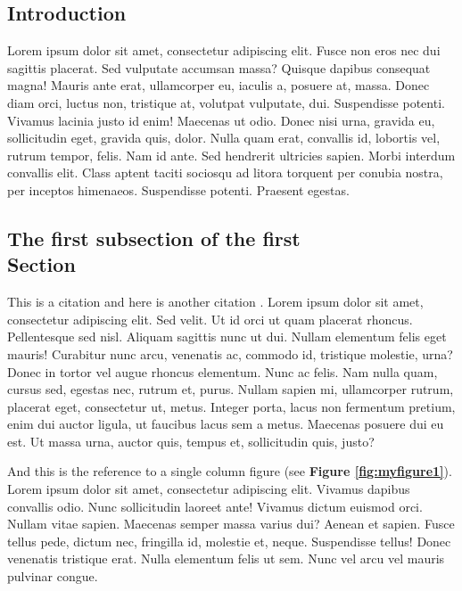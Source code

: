\documentclass[a4paper,10pt]{article}
\begin{document}
\vspace{4ex}	%
\begin{multicols}{2}

\section{Introduction}

Lorem ipsum dolor sit amet, consectetur adipiscing elit.  Fusce non eros nec dui
sagittis placerat. Sed vulputate accumsan massa? Quisque dapibus consequat
magna! Mauris ante erat, ullamcorper eu, iaculis a, posuere at, massa. Donec
diam orci, luctus non, tristique at, volutpat vulputate, dui.  Suspendisse
potenti. Vivamus lacinia justo id enim! Maecenas ut odio. Donec nisi urna,
gravida eu, sollicitudin eget, gravida quis, dolor. Nulla quam erat, convallis
id, lobortis vel, rutrum tempor, felis. Nam id ante. Sed hendrerit ultricies
sapien. Morbi interdum convallis elit. Class aptent taciti sociosqu ad litora
torquent per conubia nostra, per inceptos himenaeos. Suspendisse potenti.
Praesent egestas.


\subsection{The first subsection of the first \\ Section}

This is a citation \cite{Norman09Learn} and here is another citation
\cite{Peyton93Howto}.  Lorem ipsum dolor sit amet, consectetur adipiscing elit.
Sed velit. Ut id orci ut quam placerat rhoncus. Pellentesque sed nisl. Aliquam
sagittis nunc ut dui.  Nullam elementum felis eget mauris! Curabitur nunc arcu,
venenatis ac, commodo id, tristique molestie, urna? Donec in tortor vel augue
rhoncus elementum. Nunc ac felis. Nam nulla quam, cursus sed, egestas nec,
rutrum et, purus. Nullam sapien mi, ullamcorper rutrum, placerat eget,
consectetur ut, metus. Integer porta, lacus non fermentum pretium, enim dui
auctor ligula, ut faucibus lacus sem a metus. Maecenas posuere dui eu est. Ut
massa urna, auctor quis, tempus et, sollicitudin quis, justo?


And this is the reference to a single column figure (see {\bf Figure
\ref{fig:myfigure1}}).  Lorem ipsum dolor sit amet, consectetur adipiscing elit.
Vivamus dapibus convallis odio. Nunc sollicitudin laoreet ante! Vivamus dictum
euismod orci.  Nullam vitae sapien. Maecenas semper massa varius dui? Aenean et
sapien. Fusce tellus pede, dictum nec, fringilla id, molestie et, neque.
Suspendisse tellus!  Donec venenatis tristique erat. Nulla elementum felis ut
sem. Nunc vel arcu vel mauris pulvinar congue.


\end{multicols}
\end{document}

